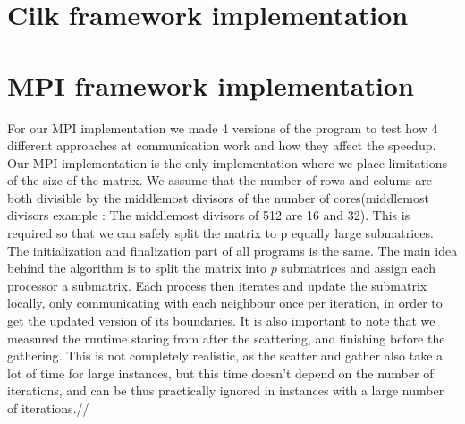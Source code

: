 \documentclass[11pt]{article}
\begin{document}
\section{Cilk framework implementation}

\section{MPI framework implementation}
For our MPI implementation we made 4 versions of the program to test how 4 different approaches at communication work and how they affect the speedup.
Our MPI implementation is the only implementation where we place limitations of the size of the matrix. We assume that the number of rows and colums
are both divisible by the middlemost divisors of the number of cores(middlemost divisors example : The middlemost divisors of 512 are
16 and 32). This is required so that we can safely split the matrix to p equally large submatrices.
The initialization and finalization part of all programs is the same. The main idea behind the algorithm is to split the matrix into $p$ submatrices and assign
each processor a submatrix. Each process then iterates and update the submatrix locally, only communicating with each neighbour once per iteration, in order to
get the updated version of its boundaries. It is also important to note that we measured the runtime staring from after the scattering, and finishing before the gathering.
This is not completely realistic, as the scatter and gather also take a lot of time for large instances, but this time doesn't depend on the number of iterations, and can be thus
practically ignored in instances with a large number of iterations.//
\end{document}
